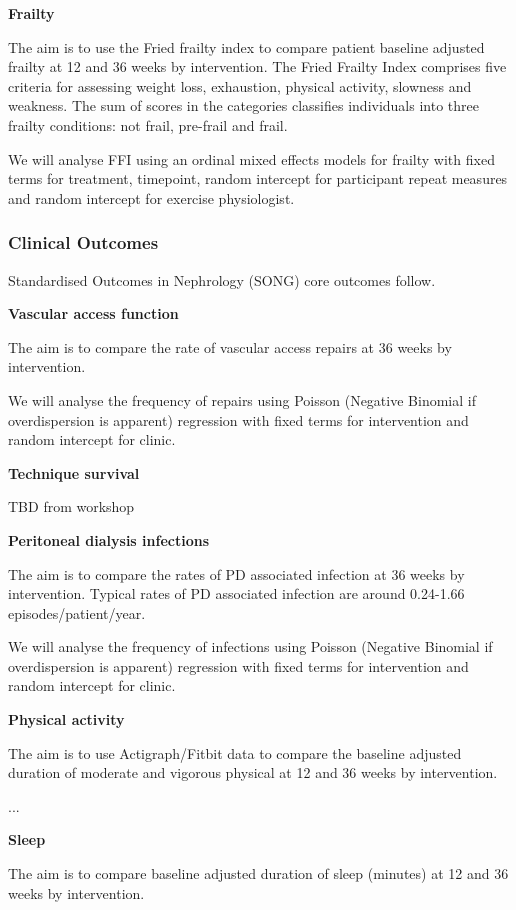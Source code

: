 \documentclass[
]{article}
\begin{document}
\textbf{Frailty}

The aim is to use the Fried frailty index to compare patient baseline adjusted frailty at 12 and 36 weeks by intervention.
The Fried Frailty Index comprises five criteria for assessing weight loss, exhaustion, physical activity, slowness and weakness.
The sum of scores in the categories classifies individuals into three frailty conditions: not frail, pre-frail and frail.

We will analyse FFI using an ordinal mixed effects models for frailty with fixed terms for treatment, timepoint, random intercept for participant repeat measures and random intercept for exercise physiologist.


\hypertarget{clinical-outcomes}{%
  \subsubsection{Clinical Outcomes}\label{clinical-outcomes}}

Standardised Outcomes in Nephrology (SONG) core outcomes follow.

\textbf{Vascular access function}

The aim is to compare the rate of vascular access repairs at 36 weeks by intervention.

We will analyse the frequency of repairs using Poisson (Negative Binomial if overdispersion is apparent) regression with fixed terms for intervention and random intercept for clinic.

\textbf{Technique survival}

TBD from workshop

\textbf{Peritoneal dialysis infections}

The aim is to compare the rates of PD associated infection at 36 weeks by intervention.
Typical rates of PD associated infection are around 0.24-1.66 episodes/patient/year.

We will analyse the frequency of infections using Poisson (Negative Binomial if overdispersion is apparent) regression with fixed terms for intervention and random intercept for clinic.

\textbf{Physical activity}

The aim is to use Actigraph/Fitbit data to compare the baseline adjusted duration of moderate and vigorous physical at 12 and 36 weeks by intervention.

...

\textbf{Sleep}

The aim is to compare baseline adjusted duration of sleep (minutes) at 12 and 36 weeks by intervention.
\end{document}
